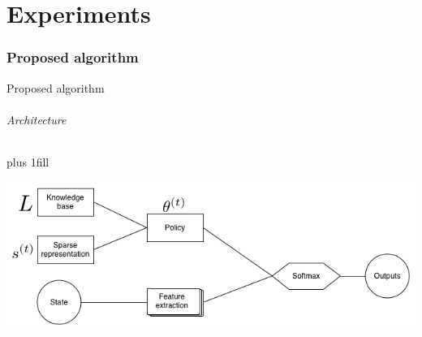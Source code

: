 \documentclass{beamer}
\begin{document}
\part{Experiments}
\section{Proposed algorithm}
\begin{frame}[fragile]{Proposed algorithm}
\framesubtitle{Architecture}
\vskip0pt plus 1fill
\begin{center}
    \includegraphics[width=\linewidth]{knowledge_transfer.png}
\end{center}
\end{frame}
\end{document}
